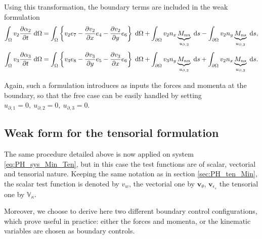 \documentclass[preprint,12pt]{elsarticle}
\begin{document}
Using this transformation, the boundary terms are included in the weak formulation
\begin{equation}
\label{eq:line2_min_bp}
\int_{\Omega} v_2 \diffp{\alpha_2}{t} \d\Omega = \int_{\Omega} \left\{ v_2 e_7 - \diffp{v_2}{x} e_4 - \diffp{v_2}{y} e_6 \right\} \d\Omega + \int_{\partial \Omega} v_2 n_x \underbrace{M_{nn}}_{u_{\partial, 2}}  \d{s} - \int_{\partial \Omega} v_2 n_y \underbrace{M_{ns}}_{u_{\partial, 3}} \d{s},
\end{equation}
\begin{equation}
\label{eq:line3_min_bp}
\int_{\Omega} v_3 \diffp{\alpha_3}{t} \d\Omega = \int_{\Omega} \left\{ v_3 e_8 - \diffp{v_3}{y} e_5 - \diffp{v_3}{x} e_6 \right\} \d\Omega + \int_{\partial \Omega} v_3 n_y \underbrace{M_{nn}}_{u_{\partial, 2}}  \d{s} + \int_{\partial \Omega} v_2 n_x \underbrace{M_{ns}}_{u_{\partial, 3}} \d{s}.
\end{equation}

Again, such a formulation introduces as inputs the forces and momenta at the boundary, so that the free case can be easily handled by setting $u_{\partial, 1}=0, \ u_{\partial, 2}=0, \ u_{\partial, 3}=0$.

\subsection{Weak form for the tensorial formulation}
The same procedure detailed above is now applied on system \eqref{eq:PH_sys_Min_Ten}, but in this case the test functions are of scalar, vectorial and tensorial nature. Keeping the same notation as in section \ref{sec:PH_ten_Min}, the scalar test function is denoted by $v_w$, the vectorial one by $\bm{v}_{\theta}$, $\bm{v}_{\epsilon_s}$  the tensorial one by $\mathbb{V}_{\kappa}$.

Moreover,  we choose to derive here two different boundary control configurations, which prove useful in practice: either the forces and momenta, or the kinematic variables are chosen as boundary controls.
\end{document}
